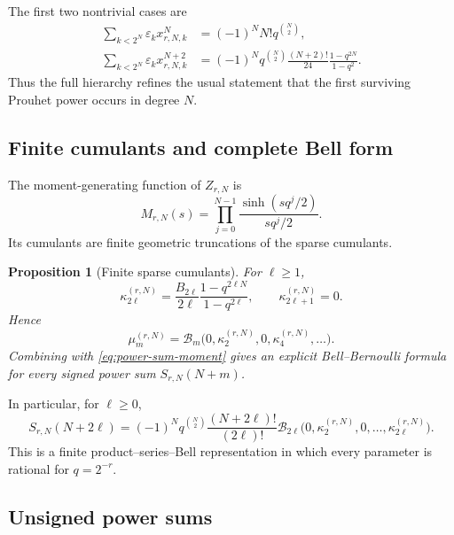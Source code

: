 \documentclass[11pt,oneside]{article}
\numberwithin{equation}{section}
\newtheorem{proposition}[theorem]{Proposition}
\theoremstyle{definition}
\theoremstyle{remark}
\newcommand{\eps}{\varepsilon}
\newcommand{\cB}{\mathcal B}
\begin{document}
The first two nontrivial cases are
\begin{align}
 \sum_{k<2^N}\eps_kx_{r,N,k}^{N}
 &=(-1)^NN!q^{\binom N2},                                 \label{eq:first-survivor}\\
 \sum_{k<2^N}\eps_kx_{r,N,k}^{N+2}
 &=(-1)^Nq^{\binom N2}\frac{(N+2)!}{24}
   \frac{1-q^{2N}}{1-q^2}.                                \label{eq:second-survivor}
\end{align}
Thus the full hierarchy refines the usual statement that the first surviving
Prouhet power occurs in degree $N$.

\subsection{Finite cumulants and complete Bell form}

The moment-generating function of $Z_{r,N}$ is
\begin{equation}
 M_{r,N}(s)=\prod_{j=0}^{N-1}\frac{\sinh(sq^j/2)}{sq^j/2}. \label{eq:MrN}
\end{equation}
Its cumulants are finite geometric truncations of the sparse cumulants.

\begin{proposition}[Finite sparse cumulants]
\label{prop:finite-sparse-cumulants}
For $\ell\ge1$,
\begin{equation}
 \kappa_{2\ell}^{(r,N)}
 =\frac{B_{2\ell}}{2\ell}
   \frac{1-q^{2\ell N}}{1-q^{2\ell}},
 \qquad
 \kappa_{2\ell+1}^{(r,N)}=0.                              \label{eq:finite-cumulants}
\end{equation}
Hence
\begin{equation}
 \mu_m^{(r,N)}
 =\cB_m\bigl(0,\kappa_2^{(r,N)},0,\kappa_4^{(r,N)},\ldots\bigr). \label{eq:finite-Bell-moments}
\end{equation}
Combining with \eqref{eq:power-sum-moment} gives an explicit
Bell--Bernoulli formula for every signed power sum $S_{r,N}(N+m)$.
\end{proposition}

In particular, for $\ell\ge0$,
\begin{equation}
 S_{r,N}(N+2\ell)
 =(-1)^Nq^{\binom N2}\frac{(N+2\ell)!}{(2\ell)!}
 \cB_{2\ell}\bigl(0,\kappa_2^{(r,N)},0,\ldots,
                    \kappa_{2\ell}^{(r,N)}\bigr).          \label{eq:Bell-power-sum}
\end{equation}
This is a finite product--series--Bell representation in which every parameter
is rational for $q=2^{-r}$.

\subsection{Unsigned power sums}
\end{document}
